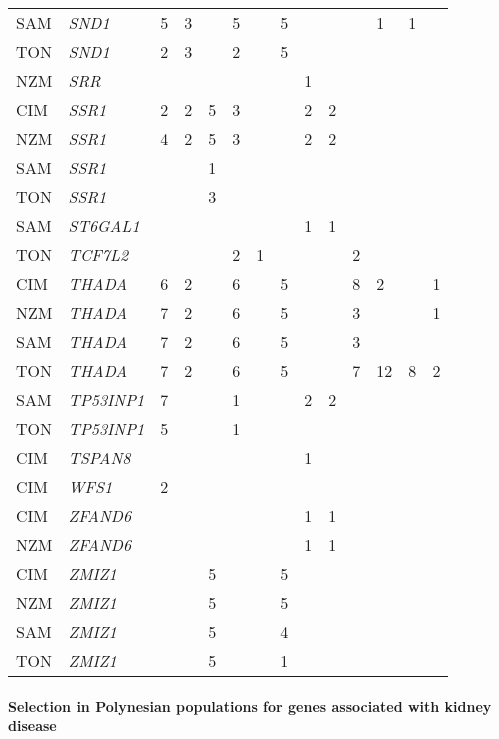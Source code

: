 \documentclass[]{report}
\let\oldparagraph\paragraph
\renewcommand{\paragraph}[1]{\oldparagraph{#1}\mbox{}}
\begin{document}
\begin{ThreePartTable}
\begin{longtable}[t]{llllllllllllll}
SAM & \em{SND1} & 5 & 3 &  & 5 &  & 5 &  &  &  & 1 & 1 & \\
TON & \em{SND1} & 2 & 3 &  & 2 &  & 5 &  &  &  &  &  & \\
NZM & \em{SRR} &  &  &  &  &  &  & 1 &  &  &  &  & \\
CIM & \em{SSR1} & 2 & 2 & 5 & 3 &  &  & 2 & 2 &  &  &  & \\
NZM & \em{SSR1} & 4 & 2 & 5 & 3 &  &  & 2 & 2 &  &  &  & \\
SAM & \em{SSR1} &  &  & 1 &  &  &  &  &  &  &  &  & \\
TON & \em{SSR1} &  &  & 3 &  &  &  &  &  &  &  &  & \\
SAM & \em{ST6GAL1} &  &  &  &  &  &  & 1 & 1 &  &  &  & \\
TON & \em{TCF7L2} &  &  &  & 2 & 1 &  &  &  & 2 &  &  & \\
CIM & \em{THADA} & 6 & 2 &  & 6 &  & 5 &  &  & 8 & 2 &  & 1\\
NZM & \em{THADA} & 7 & 2 &  & 6 &  & 5 &  &  & 3 &  &  & 1\\
SAM & \em{THADA} & 7 & 2 &  & 6 &  & 5 &  &  & 3 &  &  & \\
TON & \em{THADA} & 7 & 2 &  & 6 &  & 5 &  &  & 7 & 12 & 8 & 2\\
SAM & \em{TP53INP1} & 7 &  &  & 1 &  &  & 2 & 2 &  &  &  & \\
TON & \em{TP53INP1} & 5 &  &  & 1 &  &  &  &  &  &  &  & \\
CIM & \em{TSPAN8} &  &  &  &  &  &  & 1 &  &  &  &  & \\
CIM & \em{WFS1} & 2 &  &  &  &  &  &  &  &  &  &  & \\
CIM & \em{ZFAND6} &  &  &  &  &  &  & 1 & 1 &  &  &  & \\
NZM & \em{ZFAND6} &  &  &  &  &  &  & 1 & 1 &  &  &  & \\
CIM & \em{ZMIZ1} &  &  & 5 &  &  & 5 &  &  &  &  &  & \\
NZM & \em{ZMIZ1} &  &  & 5 &  &  & 5 &  &  &  &  &  & \\
SAM & \em{ZMIZ1} &  &  & 5 &  &  & 4 &  &  &  &  &  & \\
TON & \em{ZMIZ1} &  &  & 5 &  &  & 1 &  &  &  &  &  & \\*
\end{longtable}
\end{ThreePartTable}

\endgroup{}

\paragraph{Selection in Polynesian populations for genes associated with
kidney
disease}\label{selection-in-polynesian-populations-for-genes-associated-with-kidney-disease}
\end{document}

